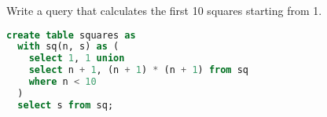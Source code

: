 \question
Write a query that calculates the first 10 squares starting from 1.
\begin{solution}[2.5cm]
\begin{lstlisting}[language=SQL]
create table squares as
  with sq(n, s) as (
    select 1, 1 union
    select n + 1, (n + 1) * (n + 1) from sq
    where n < 10
  )
  select s from sq;
\end{lstlisting}
\end{solution}

